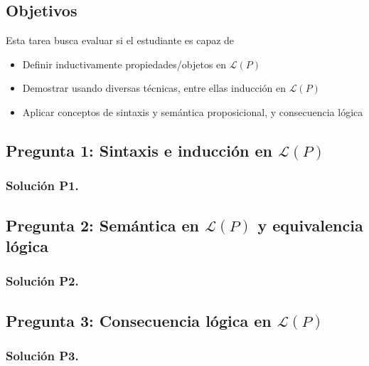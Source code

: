 \documentclass{article}
\newcommand{\cL}{\mathcal{L}}
\begin{document}
\subsection*{Objetivos}
Esta tarea busca evaluar si el estudiante es capaz de
\begin{itemize}
    \item Definir inductivamente propiedades/objetos en $\cL(P)$
    \item Demostrar usando diversas técnicas, entre ellas inducción en $\cL(P)$
    \item Aplicar conceptos de sintaxis y semántica proposicional, y consecuencia lógica
\end{itemize}

\subsection*{Pregunta 1: Sintaxis e inducción en $\cL(P)$}


\subsubsection*{Solución P1.}


\newpage
\subsection*{Pregunta 2: Semántica en $\cL(P)$ y equivalencia lógica}


\subsubsection*{Solución P2.}


\newpage
\subsection*{Pregunta 3: Consecuencia lógica en $\cL(P)$}


\subsubsection*{Solución P3.}

\end{document}

